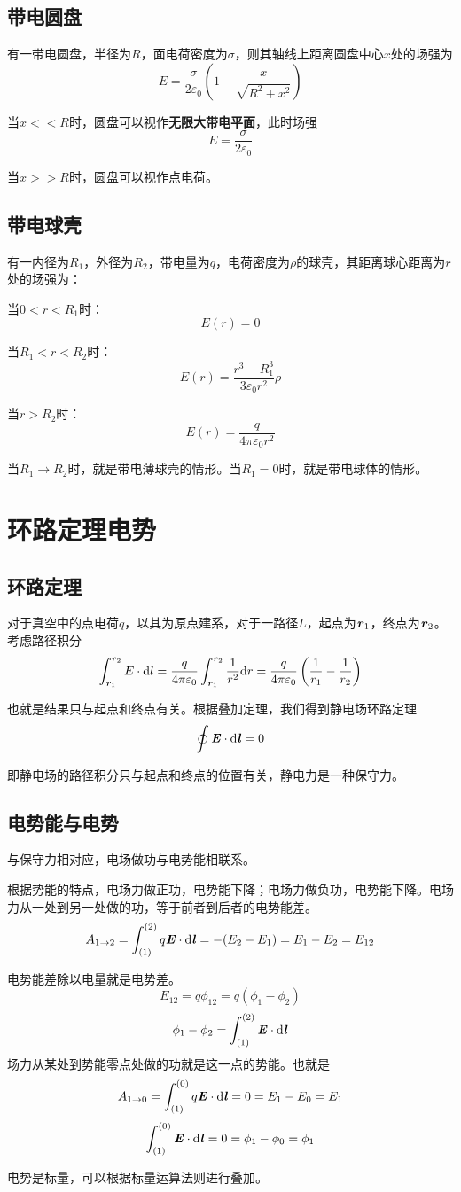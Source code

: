 \documentclass[UTF8,openany]{book}
\begin{document}
	\subsection{带电圆盘}
	有一带电圆盘，半径为$R$，面电荷密度为$\sigma$，则其轴线上距离圆盘中心$x$处的场强为
	$$E=\frac{\sigma}{2\varepsilon_0}\left( 1-\frac{x}{\sqrt{R^2+x^2}}\right)$$
	\par 当$x<<R$时，圆盘可以视作\textbf{无限大带电平面}，此时场强
	$$E=\frac{\sigma}{2\varepsilon_0}$$
	\par 当$x>>R$时，圆盘可以视作点电荷。
	\subsection{带电球壳}
	有一内径为$R_1$，外径为$R_2$，带电量为$q$，电荷密度为$\rho$的球壳，其距离球心距离为$r$处的场强为：
	\par 当$0<r<R_1$时：
	$$E(r)=0$$
	\par 当$R_1<r<R_2$时：
	$$E(r)=\frac{r^3-R_1^3}{3\varepsilon_0r^2}\rho$$
	\par 当$r>R_2$时：
	$$E(r)=\frac{q}{4\pi\varepsilon_0r^2}$$
	\par 当$R_1\rightarrow R_2$时，就是带电薄球壳的情形。当$R_1=0$时，就是带电球体的情形。
	\section{环路定理\quad 电势}
	\subsection{环路定理}
	对于真空中的点电荷$q$，以其为原点建系，对于一路径$L$，起点为$\textbf{\textit{r}}_1$，终点为$\textbf{\textit{r}}_2$。考虑路径积分
	$$\int_{\textbf{\textit{r}}_1}^{\textbf{\textit{r}}_2}E\cdot\mathrm{d}l=
	\frac{q}{4\pi\varepsilon_0}\int_{\textbf{\textit{r}}_1}^{\textbf{\textit{r}}_2}\frac{1}{r^2}\mathrm{d}r=
	\frac{q}{4\pi\varepsilon_0}\left(\frac{1}{r_1}-\frac{1}{r_2}\right)$$
	\par 也就是结果只与起点和终点有关。根据叠加定理，我们得到静电场环路定理
	$$\oint \textbf{\textit{E}}\cdot\mathrm{d}\textbf{\textit{l}}=0$$
	\par 即静电场的路径积分只与起点和终点的位置有关，静电力是一种保守力。
	\subsection{电势能与电势}
	与保守力相对应，电场做功与电势能相联系。
	\par 根据势能的特点，电场力做正功，电势能下降；电场力做负功，电势能下降。电场力从一处到另一处做的功，等于前者到后者的电势能差。
	$$A_{1\rightarrow 2}=\int_{(1)}^{(2)}q\textbf{\textit{E}}\cdot\mathrm{d}\textbf{\textit{l}}=-(E_2-E_1)=E_1-E_2=E_{12}$$
	\par 电势能差除以电量就是电势差。
	$$E_{12}=q\phi_{12}=q(\phi_1-\phi_2)$$
	$$\phi_1-\phi_2=\int_{(1)}^{(2)}\textbf{\textit{E}}\cdot\mathrm{d}\textbf{\textit{l}}$$
	场力从某处到势能零点处做的功就是这一点的势能。也就是
	$$A_{1\rightarrow 0}=\int_{(1)}^{(0)}q\textbf{\textit{E}}\cdot\mathrm{d}\textbf{\textit{l}}=0=E_1-E_0=E_{1}$$
	$$\int_{(1)}^{(0)}\textbf{\textit{E}}\cdot\mathrm{d}\textbf{\textit{l}}=0=\phi_1-\phi_0=\phi_{1}$$
	\par 电势是标量，可以根据标量运算法则进行叠加。
\end{document}
